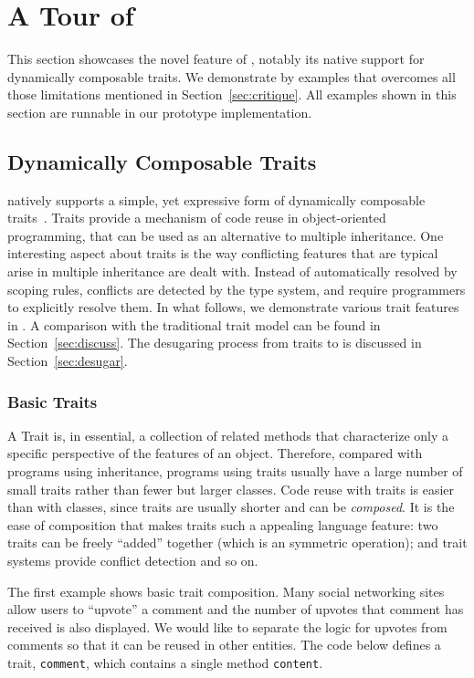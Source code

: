 \section{A Tour of \name}

This section showcases the novel feature of \name, notably its native support
for dynamically composable traits. We demonstrate by examples that \name
overcomes all those limitations mentioned in Section~\ref{sec:critique}. All
examples shown in this section are runnable in our prototype implementation.


\subsection{Dynamically Composable Traits}
\label{sec:traits}

\name natively supports a simple, yet expressive form of dynamically composable
traits~\cite{scharli2003traits}. Traits provide a mechanism of code reuse in
object-oriented programming, that can be used as an alternative to multiple
inheritance. One interesting aspect about traits is the way conflicting features
that are typical arise in multiple inheritance are dealt with. Instead of
automatically resolved by scoping rules, conflicts are detected by the type
system, and require programmers to explicitly resolve them. In what follows, we
demonstrate various trait features in \name. A comparison with the traditional
trait model can be found in Section~\ref{sec:discuss}. The desugaring process
from traits to \bname is discussed in Section~\ref{sec:desugar}.

\subsubsection{Basic Traits}

A Trait is, in essential, a collection of related methods that characterize only
a specific perspective of the features of an object. Therefore, compared with
programs using inheritance, programs using traits usually have a large number of
small traits rather than fewer but larger classes. Code reuse with traits is
easier than with classes, since traits are usually shorter and can be
\textit{composed}. It is the ease of composition that makes traits such a
appealing language feature: two traits can be freely ``added'' together (which
is an symmetric operation); and trait systems provide conflict detection and so
on.

The first example shows basic trait composition. Many social networking sites
allow users to ``upvote'' a comment and the number of upvotes that comment has
received is also displayed. We would like to separate the logic for upvotes from
comments so that it can be reused in other entities. The code below defines a
trait, \lstinline$comment$, which contains a single method \lstinline$content$.

